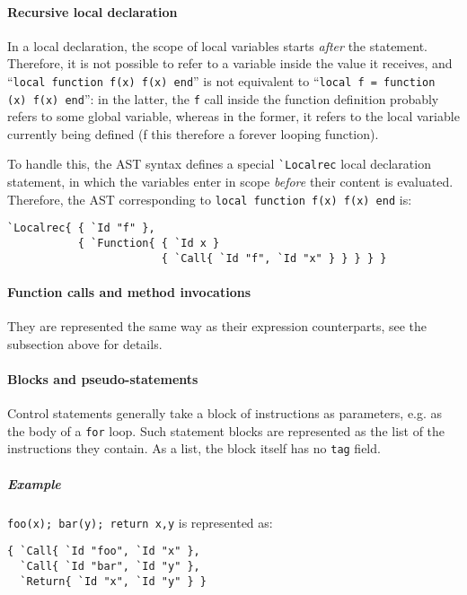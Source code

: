 \paragraph{Recursive local declaration}
In a local declaration, the scope of local variables starts {\em
  after} the statement. Therefore, it is not possible to refer to a
variable inside the value it receives, and
``{\tt local function f(x) f(x) end}'' is not equivalent to
``{\tt local f = function (x) f(x) end}'': in the latter, the \verb|f|
call inside the function definition probably refers to some global
variable, whereas in the former, it refers to the local variable
currently being defined (f this therefore a forever looping function).

To handle this, the AST syntax defines a special \verb|`Localrec|
local declaration statement, in which the variables enter in scope
{\em before} their content is evaluated. Therefore, the AST
corresponding to {\tt local function f(x) f(x) end} is:
\begin{verbatim}
`Localrec{ { `Id "f" }, 
           { `Function{ { `Id x } 
                        { `Call{ `Id "f", `Id "x" } } } } }
\end{verbatim}



\paragraph{Function calls and method invocations}
They are represented the same way as their expression counterparts,
see the subsection above for details.

\paragraph{Blocks and pseudo-statements}
Control statements generally take a block of instructions as
parameters, e.g. as the body of a \verb|for| loop. Such statement
blocks are represented as the list of the instructions they
contain. As a list, the block itself has no \verb|tag| field.

\subparagraph{Example}
\verb|foo(x); bar(y); return x,y| is represented as:
\begin{verbatim}
{ `Call{ `Id "foo", `Id "x" },
  `Call{ `Id "bar", `Id "y" },
  `Return{ `Id "x", `Id "y" } }
\end{verbatim}

